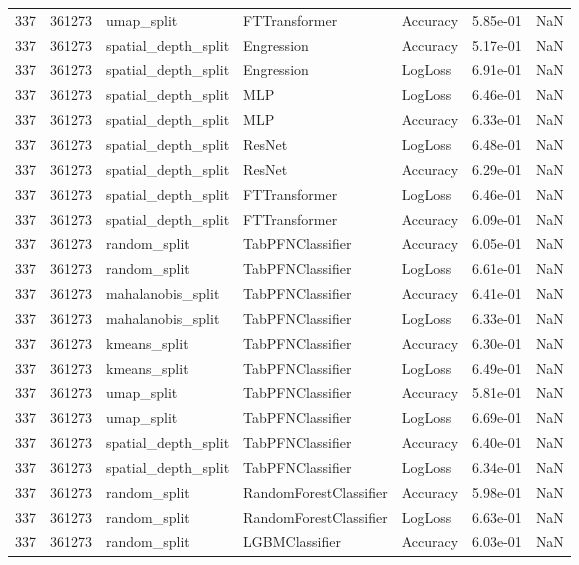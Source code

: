 \begin{tabular}{rrlllrr}
337 & 361273 & umap\_split & FTTransformer & Accuracy & 5.85e-01 & NaN \\
337 & 361273 & spatial\_depth\_split & Engression & Accuracy & 5.17e-01 & NaN \\
337 & 361273 & spatial\_depth\_split & Engression & LogLoss & 6.91e-01 & NaN \\
337 & 361273 & spatial\_depth\_split & MLP & LogLoss & 6.46e-01 & NaN \\
337 & 361273 & spatial\_depth\_split & MLP & Accuracy & 6.33e-01 & NaN \\
337 & 361273 & spatial\_depth\_split & ResNet & LogLoss & 6.48e-01 & NaN \\
337 & 361273 & spatial\_depth\_split & ResNet & Accuracy & 6.29e-01 & NaN \\
337 & 361273 & spatial\_depth\_split & FTTransformer & LogLoss & 6.46e-01 & NaN \\
337 & 361273 & spatial\_depth\_split & FTTransformer & Accuracy & 6.09e-01 & NaN \\
337 & 361273 & random\_split & TabPFNClassifier & Accuracy & 6.05e-01 & NaN \\
337 & 361273 & random\_split & TabPFNClassifier & LogLoss & 6.61e-01 & NaN \\
337 & 361273 & mahalanobis\_split & TabPFNClassifier & Accuracy & 6.41e-01 & NaN \\
337 & 361273 & mahalanobis\_split & TabPFNClassifier & LogLoss & 6.33e-01 & NaN \\
337 & 361273 & kmeans\_split & TabPFNClassifier & Accuracy & 6.30e-01 & NaN \\
337 & 361273 & kmeans\_split & TabPFNClassifier & LogLoss & 6.49e-01 & NaN \\
337 & 361273 & umap\_split & TabPFNClassifier & Accuracy & 5.81e-01 & NaN \\
337 & 361273 & umap\_split & TabPFNClassifier & LogLoss & 6.69e-01 & NaN \\
337 & 361273 & spatial\_depth\_split & TabPFNClassifier & Accuracy & 6.40e-01 & NaN \\
337 & 361273 & spatial\_depth\_split & TabPFNClassifier & LogLoss & 6.34e-01 & NaN \\
337 & 361273 & random\_split & RandomForestClassifier & Accuracy & 5.98e-01 & NaN \\
337 & 361273 & random\_split & RandomForestClassifier & LogLoss & 6.63e-01 & NaN \\
337 & 361273 & random\_split & LGBMClassifier & Accuracy & 6.03e-01 & NaN \\

\end{tabular}
